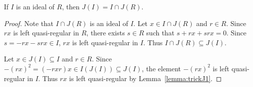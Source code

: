 \begin{proposition}
	\label{proposition:J(I)}
	If $I$ is an ideal of $R$, then $J(I)=I\cap J(R)$. 
\end{proposition}

\begin{proof}
	Note that $I\cap J(R)$ is an ideal of $I$. Let $x\in I\cap J(R)$ and $r\in R$. 
        Since $rx$ is left quasi-regular in $R$, there exists $s\in R$ such that $s+rx+srx=0$. 
	Since $s=-rx-srx\in I$, $rx$ is left quasi-regular 
	in $I$. Thus $I\cap J(R)\subseteq J(I)$. 

	Let $x\in J(I)\subseteq I$ and $r\in R$. Since $-(rx)^2=(-rxr)x\in
	I(J(I))\subseteq J(I)$, the element $-(rx)^2$ is left quasi-regular 
	in $I$. Thus $rx$ is left quasi-regular by
	Lemma~\ref{lemma:trickJ1}.
\end{proof}

